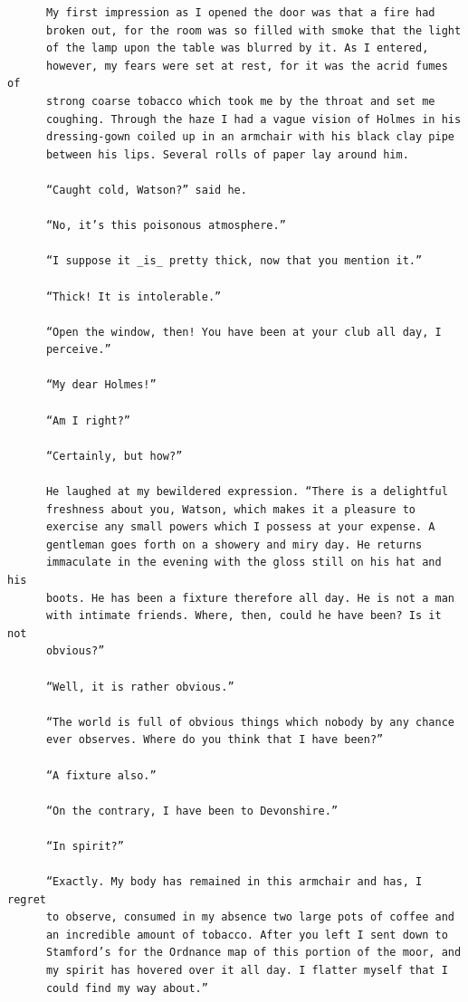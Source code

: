 \documentclass{article}
\begin{document}
\begin{verbatim}
      My first impression as I opened the door was that a fire had
      broken out, for the room was so filled with smoke that the light
      of the lamp upon the table was blurred by it. As I entered,
      however, my fears were set at rest, for it was the acrid fumes of
      strong coarse tobacco which took me by the throat and set me
      coughing. Through the haze I had a vague vision of Holmes in his
      dressing-gown coiled up in an armchair with his black clay pipe
      between his lips. Several rolls of paper lay around him.

      “Caught cold, Watson?” said he.

      “No, it’s this poisonous atmosphere.”

      “I suppose it _is_ pretty thick, now that you mention it.”

      “Thick! It is intolerable.”

      “Open the window, then! You have been at your club all day, I
      perceive.”

      “My dear Holmes!”

      “Am I right?”

      “Certainly, but how?”

      He laughed at my bewildered expression. “There is a delightful
      freshness about you, Watson, which makes it a pleasure to
      exercise any small powers which I possess at your expense. A
      gentleman goes forth on a showery and miry day. He returns
      immaculate in the evening with the gloss still on his hat and his
      boots. He has been a fixture therefore all day. He is not a man
      with intimate friends. Where, then, could he have been? Is it not
      obvious?”

      “Well, it is rather obvious.”

      “The world is full of obvious things which nobody by any chance
      ever observes. Where do you think that I have been?”

      “A fixture also.”

      “On the contrary, I have been to Devonshire.”

      “In spirit?”

      “Exactly. My body has remained in this armchair and has, I regret
      to observe, consumed in my absence two large pots of coffee and
      an incredible amount of tobacco. After you left I sent down to
      Stamford’s for the Ordnance map of this portion of the moor, and
      my spirit has hovered over it all day. I flatter myself that I
      could find my way about.”


\end{verbatim}
\end{document}
